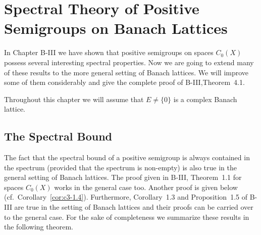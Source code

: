 

\chapter[Spectral Theory on Banach Lattices]{Spectral Theory of Positive Semigroups on Banach Lattices}\label{chap:cf-III}




In Chapter B-III we have shown that positive semigroups on spaces $C_{0}(X)$ possess several interesting spectral properties.
Now we are going to extend many of these results to the more general setting of Banach lattices.
We will improve some of them considerably and give the complete proof of B-III,Theorem~4.1.

Throughout this chapter we will assume that $E \neq \{0\}$ is a complex Banach lattice.

\section{The Spectral Bound}\label{sec:c3-1}

The fact that the spectral bound of a positive semigroup is always contained in the spectrum (provided that the spectrum is non-empty) is also true in the general setting of Banach lattices.
The proof given in B-III, Theorem~1.1 for spaces $C_{0}(X)$ works in the general case too.
Another proof is given below (cf.\ Corollary~\ref{cor:c3-1.4}).
Furthermore, Corollary~1.3 and Proposition~1.5 of B-III are true in the setting of Banach lattices and their proofs can be carried over to the general case.
For the sake of completeness we summarize these results in the following theorem.

